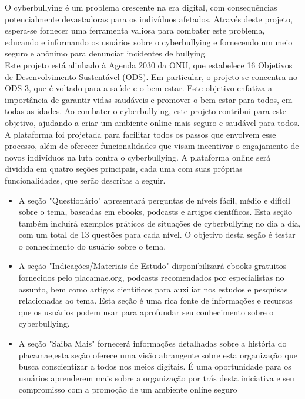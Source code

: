 O cyberbullying é um problema crescente na era digital, com consequências potencialmente devastadoras para os indivíduos afetados. Através deste projeto, espera-se fornecer uma ferramenta valiosa para combater este problema, educando e informando os usuários sobre o cyberbullying e fornecendo um meio seguro e anônimo para denunciar incidentes de bullying.\\

Este projeto está alinhado à Agenda 2030 da ONU, que estabelece 16 Objetivos de Desenvolvimento Sustentável (ODS). Em particular, o projeto se concentra no ODS 3, que é voltado para a saúde e o bem-estar. Este objetivo enfatiza a importância de garantir vidas saudáveis e promover o bem-estar para todos, em todas as idades. Ao combater o cyberbullying, este projeto contribui para este objetivo, ajudando a criar um ambiente online mais seguro e saudável para todos.\\

A plataforma foi projetada para facilitar todos os passos que envolvem esse processo, além de oferecer funcionalidades que visam incentivar o engajamento de novos indivíduos na luta contra o cyberbullying. A plataforma online será dividida em quatro seções principais, cada uma com suas próprias funcionalidades, que serão descritas a seguir.

\begin{itemize}
    \item A seção "Questionário" apresentará perguntas de níveis fácil, médio e difícil sobre o tema, baseadas em ebooks, podcasts e artigos científicos. Esta seção também incluirá exemplos práticos de situações de cyberbullying no dia a dia, com um total de 13 questões para cada nível. O objetivo desta seção é testar o conhecimento do usuário sobre o tema.

    \item A seção "Indicações/Materiais de Estudo" disponibilizará ebooks gratuitos fornecidos pelo placamae.org, podcasts recomendados por especialistas no assunto, bem como artigos científicos para auxiliar nos estudos e pesquisas relacionadas ao tema. Esta seção é uma rica fonte de informações e recursos que os usuários podem usar para aprofundar seu conhecimento sobre o cyberbullying.
    \item A seção "Saiba Mais" fornecerá informações detalhadas sobre a história do placamae,esta seção oferece uma visão abrangente sobre esta organização que busca conscientizar a todos nos meios digitais. É uma oportunidade para os usuários aprenderem mais sobre a organização por trás desta iniciativa e seu compromisso com a promoção de um ambiente online seguro

\end{itemize}

